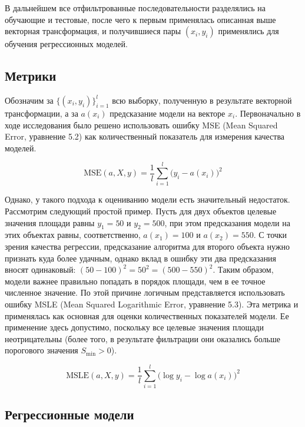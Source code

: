 \documentclass[a4paper, 12pt]{article}
\begin{document}
В дальнейшем все отфильтрованные последовательности разделялись на обучающие и тестовые, после чего к первым применялась описанная выше векторная трансформация, и получившиеся пары $(x_i, y_i)$ применялись для обучения регрессионных моделей.

\subsection{Метрики}

Обозначим за $\{(x_i, y_i)\}_{i=1}^l$ всю выборку, полученную в результате векторной трансформации, а за $a(x_i)$ предсказание модели на векторе $x_i$. Первоначально в ходе исследования было решено использовать ошибку MSE (Mean Squared Error, уравнение 5.2) как количественный показатель для измерения качества моделей.

\begin{equation}
    \text{MSE}(a, X, y) = \frac{1}{l} \sum_{i=1}^l \Big(y_i - a(x_i)\Big)^2
\end{equation}

Однако, у такого подхода к оцениванию модели есть значительный недостаток. Рассмотрим следующий простой пример. Пусть для двух объектов целевые значения площади равны $y_1 = 50$ и $y_2 = 500$, при этом предсказания модели на этих объектах равны, соответственно, $a(x_1) = 100$ и $a(x_2) = 550$. С точки зрения качества регрессии, предсказание алгоритма для второго объекта нужно признать куда более удачным, однако вклад в ошибку эти два предсказания вносят одинаковый: $(50 - 100)^2  = 50^2 = (500 - 550)^2$. Таким образом, модели важнее правильно попадать в порядок площади, чем в ее точное численное значение. По этой причине логичным представляется использовать ошибку MSLE (Mean Squared Logarithmic Error, уравнение 5.3). Эта метрика и применялась как основная для оценки количественных показателей модели. Ее применение здесь допустимо, поскольку все целевые значения площади неотрицательны (более того, в результате фильтрации они оказались больше порогового значения $S_\text{min} > 0$).

\begin{equation}
    \text{MSLE}(a, X, y) = \frac{1}{l} \sum_{i = 1}^l \Big(\log{y_i} - \log{a(x_i)} \Big)^2
\end{equation}

\subsection{Регрессионные модели}
\end{document}
